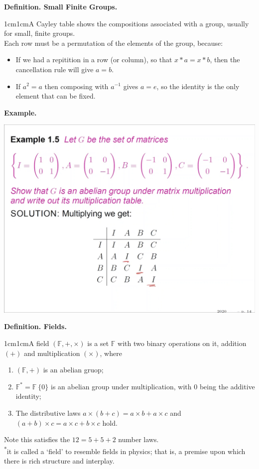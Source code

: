 \documentclass{article}
\newcommand{\definition}[2]{\textbf{Definition. #1.}\begin{adjustwidth}{1cm}{1cm}#2\end{adjustwidth}}
\begin{document}
\definition{Small Finite Groups}{A Cayley table shows the compositions associated with a group, usually for small, finite groups.\\[1\baselineskip]Each row must be a permutation of the elements of the group, because:
\begin{itemize}
  \item If we had a repitition in a row (or column), so that $x*a = x*b$, then the cancellation rule will give $a = b$.
  \item If $a^2 = a$ then composing with $a^{-1}$ gives $a = e$, so the identity is the only element that can be fixed.
\end{itemize}}
\textbf{Example.}
\begin{center}
  \includegraphics[scale=0.25]{assets/group_example.png}
\end{center}
\definition{Fields}{A field $(\mathbb{F}, +, \times)$ is a set $\mathbb{F}$ with two binary operations on it, addition $(+)$ and multiplication $(\times)$, where\begin{enumerate}\item $(\mathbb{F}, +)$ is an abelian gruop;\item $\mathbb{F}^* = \mathbb{F} \ \{0\}$ is an abelian group under multiplication, with $0$ being the additive identity;\item The distributive laws $a \times (b + c) = a \times b + a \times c$ and $(a + b) \times c = a \times c + b \times c$ hold.\end{enumerate}Note this satisfies the $12=5 + 5 + 2$ number laws.\\[1\baselineskip]\textsuperscript{*}it is called a `field' to resemble fields in physics; that is, a premise upon which there is rich structure and interplay.}~\\
\end{document}
